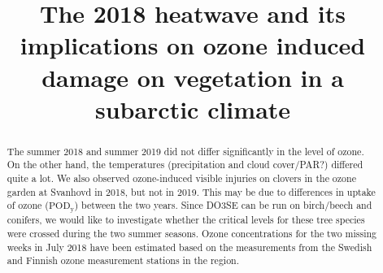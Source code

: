 \documentclass[bg, manuscript]{copernicus}
\begin{document}
\title{The 2018 heatwave and its implications on ozone induced damage on vegetation in a subarctic climate}















\received{}
\pubdiscuss{} %
\revised{}
\accepted{}
\published{}




\maketitle


\begin{abstract}
  The summer 2018 and summer 2019 did not differ significantly in the level of ozone. On the other hand, the temperatures (precipitation and cloud cover/PAR?) differed quite a lot. We also observed ozone-induced visible injuries on clovers in the ozone garden at Svanhovd in 2018, but not in 2019. This may be due to differences in uptake of ozone ($\mathrm{POD_y}$) between the two years. Since DO3SE can be run on birch/beech and conifers, we would like to investigate whether the critical levels for these tree species were crossed during the two summer seasons. Ozone concentrations for the two missing weeks in July 2018 have been estimated based on the measurements from the Swedish and Finnish ozone measurement stations in the region.  
\end{abstract}
\end{document}
